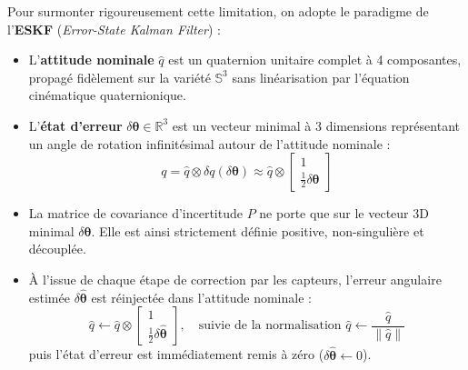 \documentclass[../Formulations_Kalman.tex]{subfiles}
\begin{document}
Pour surmonter rigoureusement cette limitation, on adopte le paradigme de l'\textbf{ESKF} (\textit{Error-State Kalman Filter}) :
\begin{itemize}
    \item L'\textbf{attitude nominale} $\hat{q}$ est un quaternion unitaire complet à 4 composantes, propagé fidèlement sur la variété $\mathbb{S}^3$ sans linéarisation par l'équation cinématique quaternionique.
    \item L'\textbf{état d'erreur} $\delta\boldsymbol{\theta} \in \mathbb{R}^3$ est un vecteur minimal à 3 dimensions représentant un angle de rotation infinitésimal autour de l'attitude nominale :
    \begin{equation}
    q = \hat{q} \otimes \delta q(\delta\boldsymbol{\theta}) \approx \hat{q} \otimes \begin{bmatrix} 1 \\ \frac{1}{2} \delta\boldsymbol{\theta} \end{bmatrix}
    \end{equation}
    \item La matrice de covariance d'incertitude $P$ ne porte que sur le vecteur 3D minimal $\delta\boldsymbol{\theta}$. Elle est ainsi strictement définie positive, non-singulière et découplée.
    \item À l'issue de chaque étape de correction par les capteurs, l'erreur angulaire estimée $\delta\hat{\boldsymbol{\theta}}$ est réinjectée dans l'attitude nominale :
    \begin{equation}
    \hat{q} \leftarrow \hat{q} \otimes \begin{bmatrix} 1 \\ \frac{1}{2} \delta\hat{\boldsymbol{\theta}} \end{bmatrix}, \quad \text{suivie de la normalisation } \hat{q} \leftarrow \frac{\hat{q}}{\|\hat{q}\|}
    \end{equation}
    puis l'état d'erreur est immédiatement remis à zéro ($\delta\hat{\boldsymbol{\theta}} \leftarrow 0$).
\end{itemize}
\end{document}
